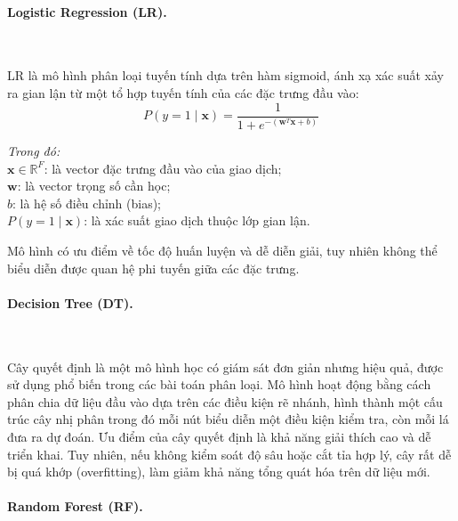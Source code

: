 \vspace{0.5em}

\paragraph{Logistic Regression (LR).}~

\vspace{0.5em}

LR là mô hình phân loại tuyến tính dựa trên hàm sigmoid, ánh xạ xác suất xảy ra gian lận từ một tổ hợp tuyến tính của các đặc trưng đầu vào:
\[
P(y=1 \mid \mathbf{x}) = \frac{1}{1 + e^{-(\mathbf{w}^T \mathbf{x} + b)}}
\]

\textit{Trong đó:} \\
$\mathbf{x} \in \mathbb{R}^F$: là vector đặc trưng đầu vào của giao dịch; \\
$\mathbf{w}$: là vector trọng số cần học; \\
$b$: là hệ số điều chỉnh (bias); \\
$P(y=1 \mid \mathbf{x})$: là xác suất giao dịch thuộc lớp gian lận.

Mô hình có ưu điểm về tốc độ huấn luyện và dễ diễn giải, tuy nhiên không thể biểu diễn được quan hệ phi tuyến giữa các đặc trưng.

\vspace{0.5em}

\paragraph{Decision Tree (DT).}~

\vspace{0.5em}

Cây quyết định là một mô hình học có giám sát đơn giản nhưng hiệu quả, được sử dụng phổ biến trong các bài toán phân loại. Mô hình hoạt động bằng cách phân chia dữ liệu đầu vào dựa trên các điều kiện rẽ nhánh, hình thành một cấu trúc cây nhị phân trong đó mỗi nút biểu diễn một điều kiện kiểm tra, còn mỗi lá đưa ra dự đoán. Ưu điểm của cây quyết định là khả năng giải thích cao và dễ triển khai. Tuy nhiên, nếu không kiểm soát độ sâu hoặc cắt tỉa hợp lý, cây rất dễ bị quá khớp (overfitting), làm giảm khả năng tổng quát hóa trên dữ liệu mới.


\vspace{0.5em}

\paragraph{Random Forest (RF).}~

